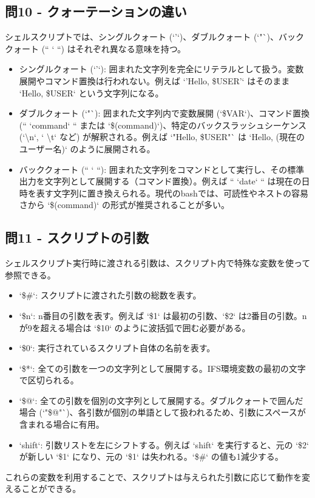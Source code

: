\documentclass[a4paper,11pt]{jsarticle}
\begin{document}
\subsection*{問10 - クォーテーションの違い}
シェルスクリプトでは、シングルクォート (`'`)、ダブルクォート (`"`)、バッククォート (`` ` ``) はそれぞれ異なる意味を持つ。
\begin{itemize}
    \item シングルクォート (`'`): 囲まれた文字列を完全にリテラルとして扱う。変数展開やコマンド置換は行われない。例えば `'Hello, \$USER'` はそのまま `Hello, \$USER` という文字列になる。
    \item ダブルクォート (`"`): 囲まれた文字列内で変数展開 (`\$VAR`)、コマンド置換 (`` `command` `` または `\$(command)`)、特定のバックスラッシュシーケンス (`\textbackslash n`, `	\textbackslash t` など) が解釈される。例えば `"Hello, \$USER"` は `Hello, (現在のユーザー名)` のように展開される。
    \item バッククォート (`` ` ``): 囲まれた文字列をコマンドとして実行し、その標準出力を文字列として展開する（コマンド置換）。例えば `` `date` `` は現在の日時を表す文字列に置き換えられる。現代のbashでは、可読性やネストの容易さから `\$(command)` の形式が推奨されることが多い。
\end{itemize}

\subsection*{問11 - スクリプトの引数}
シェルスクリプト実行時に渡される引数は、スクリプト内で特殊な変数を使って参照できる。
\begin{itemize}
    \item `\$\#`: スクリプトに渡された引数の総数を表す。
    \item `\$n`: n番目の引数を表す。例えば `\$1` は最初の引数、`\$2` は2番目の引数。nが9を超える場合は `\${10}` のように波括弧で囲む必要がある。
    \item `\$0`: 実行されているスクリプト自体の名前を表す。
    \item `\$*`: 全ての引数を一つの文字列として展開する。IFS環境変数の最初の文字で区切られる。
    \item `\$@`: 全ての引数を個別の文字列として展開する。ダブルクォートで囲んだ場合 (`"\$@"`)、各引数が個別の単語として扱われるため、引数にスペースが含まれる場合に有用。
    \item `shift`: 引数リストを左にシフトする。例えば `shift` を実行すると、元の `\$2` が新しい `\$1` になり、元の `\$1` は失われる。`\$\#` の値も1減少する。
\end{itemize}
これらの変数を利用することで、スクリプトは与えられた引数に応じて動作を変えることができる。
\end{document}
